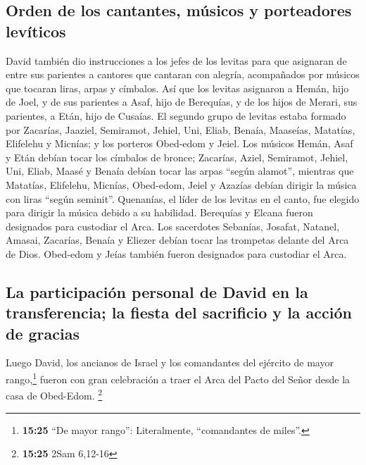 \hypertarget{orden-de-los-cantantes-muxfasicos-y-porteadores-levuxedticos}{%
\subsection{Orden de los cantantes, músicos y porteadores
levíticos}\label{orden-de-los-cantantes-muxfasicos-y-porteadores-levuxedticos}}

 David también dio instrucciones a los jefes de los
levitas para que asignaran de entre sus parientes a cantores que
cantaran con alegría, acompañados por músicos que tocaran liras, arpas y
címbalos.  Así que los levitas asignaron a Hemán, hijo de
Joel, y de sus parientes a Asaf, hijo de Berequías, y de los hijos de
Merari, sus parientes, a Etán, hijo de Cusaías.  El
segundo grupo de levitas estaba formado por Zacarías, Jaaziel,
Semiramot, Jehiel, Uni, Eliab, Benaía, Maaseías, Matatías, Elifelehu y
Micnías; y los porteros Obed-edom y Jeiel.  Los músicos
Hemán, Asaf y Etán debían tocar los címbalos de bronce; 
Zacarías, Aziel, Semiramot, Jehiel, Uni, Eliab, Maasé y Benaía debían
tocar las arpas ``según alamot'',  mientras que Matatías,
Elifelehu, Micnías, Obed-edom, Jeiel y Azazías debían dirigir la música
con liras ``según seminit''.  Quenanías, el líder de los
levitas en el canto, fue elegido para dirigir la música debido a su
habilidad.  Berequías y Elcana fueron designados para
custodiar el Arca.  Los sacerdotes Sebanías, Josafat,
Natanel, Amasai, Zacarías, Benaía y Eliezer debían tocar las trompetas
delante del Arca de Dios. Obed-edom y Jeías también fueron designados
para custodiar el Arca.

\hypertarget{la-participaciuxf3n-personal-de-david-en-la-transferencia-la-fiesta-del-sacrificio-y-la-acciuxf3n-de-gracias}{%
\subsection{La participación personal de David en la transferencia; la
fiesta del sacrificio y la acción de
gracias}\label{la-participaciuxf3n-personal-de-david-en-la-transferencia-la-fiesta-del-sacrificio-y-la-acciuxf3n-de-gracias}}

 Luego David, los ancianos de Israel y los comandantes
del ejército de mayor rango,\footnote{\textbf{15:25} ``De mayor rango'':
  Literalmente, ``comandantes de miles''.} fueron con gran celebración a
traer el Arca del Pacto del Señor desde la casa de Obed-Edom.
\footnote{\textbf{15:25} 2Sam 6,12-16}


